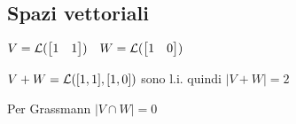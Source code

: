 \subsection{Spazi vettoriali}
$V = \mathcal{L}(\begin{bmatrix}1 & 1\end{bmatrix}) \quad W = \mathcal{L}(\begin{bmatrix}1 & 0\end{bmatrix})$

$V+W = \mathcal{L}([1,1], [1,0])$ sono l.i. quindi $|V+W| = 2$

Per Grassmann $|V \cap W| = 0$
